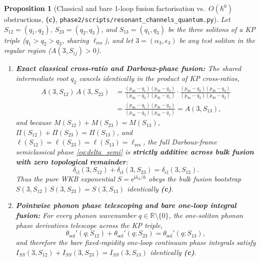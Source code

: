 \documentclass[11pt,a4paper]{article}
\newcommand{\Lc}{\textsf{\textbf{(c)}}\xspace}
\newcommand{\ii}{\mathrm{i}}
\newcommand{\ee}{\mathrm{e}}
\newcommand{\hb}{\hbar}
\newcommand{\squant}{\texttt{phase2/\allowbreak scripts/\allowbreak resonant\_\allowbreak channels\_\allowbreak quantum.py}}
\newtheorem{proposition}{Proposition}[section]
\theoremstyle{remark}
\begin{document}
\begin{proposition}[Classical and bare 1-loop fusion factorisation vs.\ $O(\hb^0)$ obstructions, \Lc, \squant]\label{prop:three_body}
Let $S_{12}=(q_1,q_2)$, $S_{23}=(q_2,q_3)$, and $S_{13}=(q_1,q_3)$ be the three
solitons of a KP triple ($q_1>q_2>q_3$, sharing $\ell_{\mathrm{res}}$), and let
$3 = (\alpha_3,\epsilon_3)$ be any test soliton in the regular region
($A(3,S_{ij}) > 0$).
\begin{enumerate}
\item \textbf{Exact classical cross-ratio and Darboux-phase fusion:}
The shared intermediate root $q_2$ cancels identically in the product of KP
cross-ratios,
\begin{align}\label{eq:A_fusion}
  A(3,S_{12})\,A(3,S_{23})
  &= \frac{(p_{3a}-q_1)(p_{3b}-q_2)}{(p_{3a}-q_2)(p_{3b}-q_1)}\cdot
     \frac{(p_{3a}-q_2)(p_{3b}-q_3)}{(p_{3a}-q_3)(p_{3b}-q_2)} \nonumber\\
  &= \frac{(p_{3a}-q_1)(p_{3b}-q_3)}{(p_{3a}-q_3)(p_{3b}-q_1)}
   = A(3,S_{13}),
\end{align}
and because $M(S_{12})+M(S_{23})=M(S_{13})$, $\Pi(S_{12})+\Pi(S_{23})=\Pi(S_{13})$,
and $\ell(S_{12})=\ell(S_{23})=\ell(S_{13})=\ell_{\mathrm{res}}$, the full
Darboux-frame semiclassical phase \eqref{eq:delta_semi} is \textbf{strictly
additive across bulk fusion with zero topological remainder}:
\begin{equation}\label{eq:delta_bulk_fusion}
  \boxed{\;
  \delta_{\mathrm{cl}}(3,S_{12}) + \delta_{\mathrm{cl}}(3,S_{23})
  = \delta_{\mathrm{cl}}(3,S_{13}).
  \;}
\end{equation}
Thus the pure WKB exponential $S = \ee^{\ii\delta_{\mathrm{cl}}/\hb}$ obeys the
bulk fusion bootstrap $S(3,S_{12})\,S(3,S_{23}) = S(3,S_{13})$ identically \Lc.

\item \textbf{Pointwise phonon phase telescoping and bare one-loop integral fusion:}
For every phonon wavenumber $q \in \mathbb{R}\setminus\{0\}$, the one-soliton
phonon phase derivatives telescope across the KP triple,
\begin{equation}\label{eq:phonon_dt_telescope}
  \theta_{\mathrm{sol}}'(q;S_{12}) + \theta_{\mathrm{sol}}'(q;S_{23})
  = \theta_{\mathrm{sol}}'(q;S_{13}),
\end{equation}
and therefore the bare fixed-rapidity one-loop continuum phase integrals satisfy
$I_{SS}(3,S_{12}) + I_{SS}(3,S_{23}) = I_{SS}(3,S_{13})$ identically \Lc.


\end{enumerate}
\end{proposition}
\end{document}
